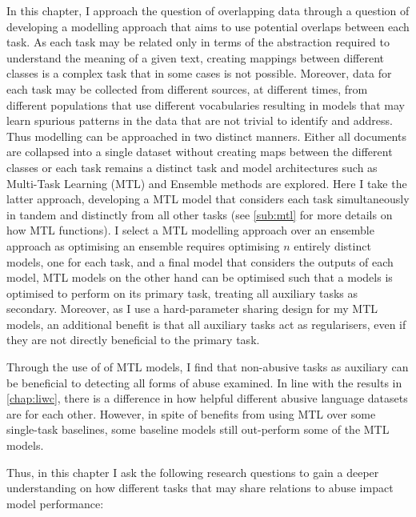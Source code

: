 In this chapter, I approach the question of overlapping data through a question of developing a modelling approach that aims to use potential overlaps between each task.
As each task may be related only in terms of the abstraction required to understand the meaning of a given text, creating mappings between different classes is a complex task that in some cases is not possible.
Moreover, data for each task may be collected from different sources, at different times, from different populations that use different vocabularies resulting in models that may learn spurious patterns in the data that are not trivial to identify and address.
Thus modelling can be approached in two distinct manners. Either all documents are collapsed into a single dataset without creating maps between the different classes or each task remains a distinct task and model architectures such as Multi-Task Learning (MTL) and Ensemble methods are explored.
Here I take the latter approach, developing a MTL model that considers each task simultaneously in tandem and distinctly from all other tasks (see \cref{sub:mtl} for more details on how MTL functions).
I select a MTL modelling approach over an ensemble approach as optimising an ensemble requires optimising $n$ entirely distinct models, one for each task, and a final model that considers the outputs of each model, MTL models on the other hand can be optimised such that a models is optimised to perform on its primary task, treating all auxiliary tasks as secondary.
Moreover, as I use a hard-parameter sharing design for my MTL models, an additional benefit is that all auxiliary tasks act as regularisers, even if they are not directly beneficial to the primary task.

Through the use of of MTL models, I find that non-abusive tasks as auxiliary can be beneficial to detecting all forms of abuse examined.
In line with the results in \cref{chap:liwc}, there is a difference in how helpful different abusive language datasets are for each other.
However, in spite of benefits from using MTL over some single-task baselines, some baseline models still out-perform some of the MTL models.


Thus, in this chapter I ask the following research questions to gain a deeper understanding on how different tasks that may share relations to abuse impact model performance:


